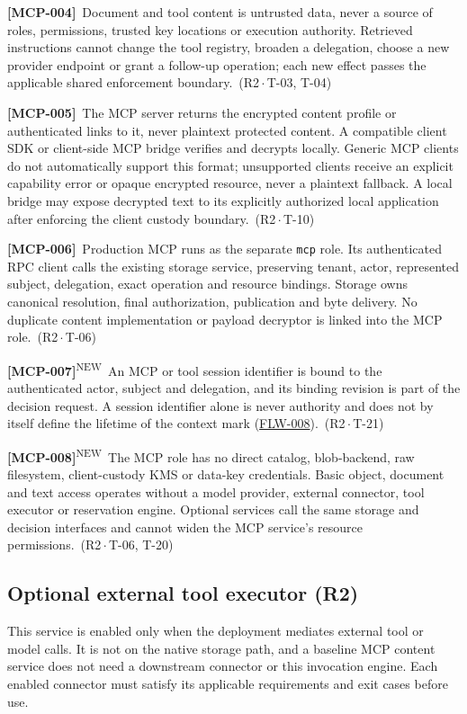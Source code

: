 \documentclass[11pt,a4paper]{article}
\newcommand{\code}[1]{{\small\nolinkurl{#1}}}
\newcommand{\rr}[1]{\hyperlink{req:#1}{#1}}
\newcommand{\reqtag}[2]{{\footnotesize\color{accent}(#1\,$\cdot$\,#2)}}
\newcommand{\req}[4]{\par\noindent\hypertarget{req:#1}{\textbf{[#1]}}\ #4\ \reqtag{#2}{#3}\par}
\newcommand{\reqn}[4]{\par\noindent\hypertarget{req:#1}{\textbf{[#1]}}\textsuperscript{\color{accent}\tiny NEW}\ #4\ \reqtag{#2}{#3}\par}
\begin{document}
\req{MCP-004}{R2}{T-03, T-04}{Document and tool content is untrusted data, never a source of roles, permissions, trusted key locations or execution authority. Retrieved instructions cannot change the tool registry, broaden a delegation, choose a new provider endpoint or grant a follow-up operation; each new effect passes the applicable shared enforcement boundary.}
\req{MCP-005}{R2}{T-10}{The MCP server returns the encrypted content profile or authenticated links to it, never plaintext protected content. A compatible client SDK or client-side MCP bridge verifies and decrypts locally. Generic MCP clients do not automatically support this format; unsupported clients receive an explicit capability error or opaque encrypted resource, never a plaintext fallback. A local bridge may expose decrypted text to its explicitly authorized local application after enforcing the client custody boundary.}
\req{MCP-006}{R2}{T-06}{Production MCP runs as the separate \code{mcp} role. Its authenticated RPC client calls the existing storage service, preserving tenant, actor, represented subject, delegation, exact operation and resource bindings. Storage owns canonical resolution, final authorization, publication and byte delivery. No duplicate content implementation or payload decryptor is linked into the MCP role.}
\reqn{MCP-007}{R2}{T-21}{An MCP or tool session identifier is bound to the authenticated actor, subject and delegation, and its binding revision is part of the decision request. A session identifier alone is never authority and does not by itself define the lifetime of the context mark (\rr{FLW-008}).}

\reqn{MCP-008}{R2}{T-06, T-20}{The MCP role has no direct catalog, blob-backend, raw filesystem, client-custody KMS or data-key credentials. Basic object, document and text access operates without a model provider, external connector, tool executor or reservation engine. Optional services call the same storage and decision interfaces and cannot widen the MCP service's resource permissions.}

\subsection{Optional external tool executor (R2)}
This service is enabled only when the deployment mediates external tool or model calls. It is not on the native storage path, and a baseline MCP content service does not need a downstream connector or this invocation engine. Each enabled connector must satisfy its applicable requirements and exit cases before use.
\end{document}
